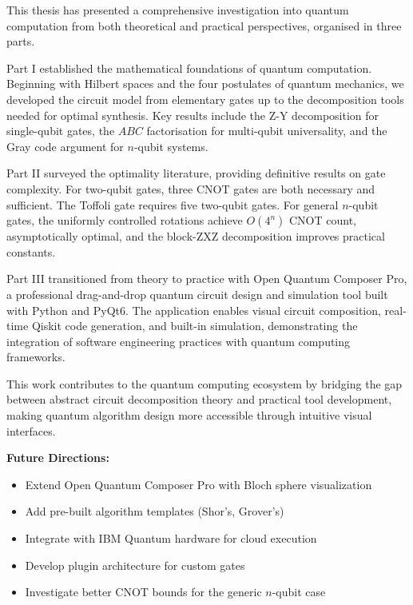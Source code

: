 \documentclass[12pt, a4paper, oneside]{report}
\theoremstyle{plain}
\theoremstyle{definition}
\theoremstyle{remark}
\begin{document}
This thesis has presented a comprehensive investigation into quantum computation from both theoretical and practical perspectives, organised in three parts.

Part I established the mathematical foundations of quantum computation. Beginning with Hilbert spaces and the four postulates of quantum mechanics, we developed the circuit model from elementary gates up to the decomposition tools needed for optimal synthesis. Key results include the Z-Y decomposition for single-qubit gates, the $ABC$ factorisation for multi-qubit universality, and the Gray code argument for $n$-qubit systems.

Part II surveyed the optimality literature, providing definitive results on gate complexity. For two-qubit gates, three CNOT gates are both necessary and sufficient. The Toffoli gate requires five two-qubit gates. For general $n$-qubit gates, the uniformly controlled rotations achieve $O(4^n)$ CNOT count, asymptotically optimal, and the block-ZXZ decomposition improves practical constants.

Part III transitioned from theory to practice with Open Quantum Composer Pro, a professional drag-and-drop quantum circuit design and simulation tool built with Python and PyQt6. The application enables visual circuit composition, real-time Qiskit code generation, and built-in simulation, demonstrating the integration of software engineering practices with quantum computing frameworks.

This work contributes to the quantum computing ecosystem by bridging the gap between abstract circuit decomposition theory and practical tool development, making quantum algorithm design more accessible through intuitive visual interfaces.

\vspace{1em}
\noindent\textbf{Future Directions:}
\begin{itemize}
    \item Extend Open Quantum Composer Pro with Bloch sphere visualization
    \item Add pre-built algorithm templates (Shor's, Grover's)
    \item Integrate with IBM Quantum hardware for cloud execution
    \item Develop plugin architecture for custom gates
    \item Investigate better CNOT bounds for the generic $n$-qubit case
\end{itemize}


\appendix
\end{document}
